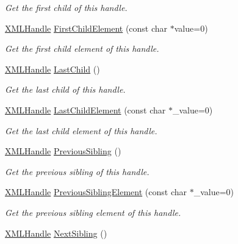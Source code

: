 \begin{DoxyCompactItemize}
\begin{DoxyCompactList}\small\item\em Get the first child of this handle. \end{DoxyCompactList}\item 
\hyperlink{classtinyxml2_1_1_x_m_l_handle}{X\+M\+L\+Handle} \hyperlink{classtinyxml2_1_1_x_m_l_handle_a99edff695a3cd3feff8a329189140a33}{First\+Child\+Element} (const char $\ast$value=0)
\begin{DoxyCompactList}\small\item\em Get the first child element of this handle. \end{DoxyCompactList}\item 
\hyperlink{classtinyxml2_1_1_x_m_l_handle}{X\+M\+L\+Handle} \hyperlink{classtinyxml2_1_1_x_m_l_handle_a9d09f04435f0f2f7d0816b0198d0517b}{Last\+Child} ()
\begin{DoxyCompactList}\small\item\em Get the last child of this handle. \end{DoxyCompactList}\item 
\hyperlink{classtinyxml2_1_1_x_m_l_handle}{X\+M\+L\+Handle} \hyperlink{classtinyxml2_1_1_x_m_l_handle_a4073e768ebc434b2605343b709a9a554}{Last\+Child\+Element} (const char $\ast$\+\_\+value=0)
\begin{DoxyCompactList}\small\item\em Get the last child element of this handle. \end{DoxyCompactList}\item 
\hyperlink{classtinyxml2_1_1_x_m_l_handle}{X\+M\+L\+Handle} \hyperlink{classtinyxml2_1_1_x_m_l_handle_a428374e756f4db4cbc287fec64eae02c}{Previous\+Sibling} ()
\begin{DoxyCompactList}\small\item\em Get the previous sibling of this handle. \end{DoxyCompactList}\item 
\hyperlink{classtinyxml2_1_1_x_m_l_handle}{X\+M\+L\+Handle} \hyperlink{classtinyxml2_1_1_x_m_l_handle_a31a0d5d060292bec5df2b2efe2eca228}{Previous\+Sibling\+Element} (const char $\ast$\+\_\+value=0)
\begin{DoxyCompactList}\small\item\em Get the previous sibling element of this handle. \end{DoxyCompactList}\item 
\hyperlink{classtinyxml2_1_1_x_m_l_handle}{X\+M\+L\+Handle} \hyperlink{classtinyxml2_1_1_x_m_l_handle_aad2eccc7c7c7b18145877c978c3850b5}{Next\+Sibling} ()

\end{DoxyCompactItemize}
